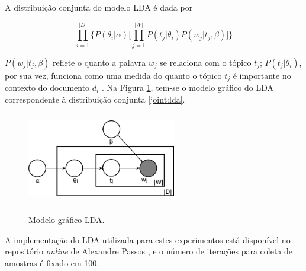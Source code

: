 A distribuição conjunta do modelo LDA é dada por

\begin{equation}
\label{joint:lda}
\ensuremath{\prod_{i=1}^{|D|} \bigg\{P(\theta_i|\alpha)\bigg[\prod_{j=1}^{|W|}P(t_j|\theta_i)P(w_j|t_j,\beta)\bigg]\bigg\}}  
\end{equation}

\ensuremath{P(w_j|t_j,\beta)} reflete o quanto a palavra \ensuremath{w_j} se relaciona com o tópico \ensuremath{t_j}; \ensuremath{P(t_j|\theta_i)}, por sua vez, funciona como uma medida do quanto o tópico \ensuremath{t_j} é importante no contexto do documento \ensuremath{d_i} \cite{pnas}. Na Figura \ref{fig:lda}, tem-se o modelo gráfico do LDA correspondente à distribuição conjunta \ref{joint:lda}. 

\begin{figure}[t]
  \centering %
  \includegraphics[width=6.5cm, height=4cm]{Latent_Dirichlet_allocation.png}\\
  \caption{Modelo gráfico LDA.} %
  \label{fig:lda}
\end{figure}

A implementação do LDA utilizada para estes experimentos está disponível no repositório \emph{online} de Alexandre Passos \cite{top-lda}, e o número de iterações para coleta de amostras é fixado em 100.





